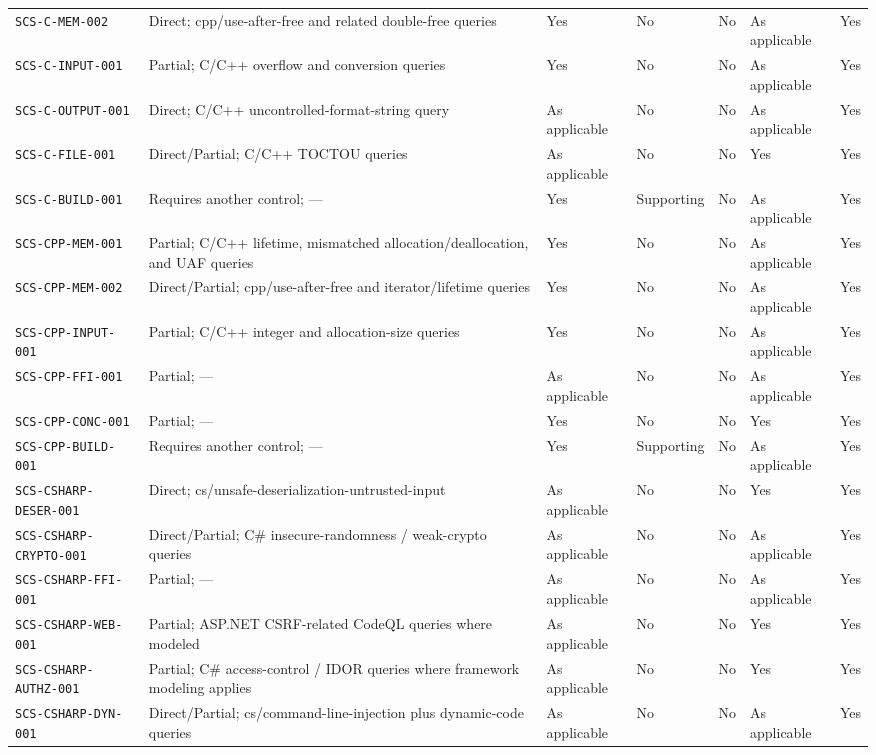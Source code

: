 \documentclass[10pt,letterpaper]{article}
\newcommand{\code}[1]{\begingroup\small\ttfamily\def\UrlFont{\ttfamily}\nolinkurl{#1}\endgroup}
\begin{document}
\begin{landscape}
\begin{longtable}{@{}P{1.4in}P{1.35in}P{1.1in}P{1.1in}P{0.95in}P{1.3in}P{1.0in}@{}}
\code{SCS-C-MEM-002} & Direct; cpp/use-after-free and related double-free queries & Yes & No & No & As applicable & Yes\\
\code{SCS-C-INPUT-001} & Partial; C/C++ overflow and conversion queries & Yes & No & No & As applicable & Yes\\
\code{SCS-C-OUTPUT-001} & Direct; C/C++ uncontrolled-format-string query & As applicable & No & No & As applicable & Yes\\
\code{SCS-C-FILE-001} & Direct/Partial; C/C++ TOCTOU queries & As applicable & No & No & Yes & Yes\\
\code{SCS-C-BUILD-001} & Requires another control; — & Yes & Supporting & No & As applicable & Yes\\
\code{SCS-CPP-MEM-001} & Partial; C/C++ lifetime, mismatched allocation/deallocation, and UAF queries & Yes & No & No & As applicable & Yes\\
\code{SCS-CPP-MEM-002} & Direct/Partial; cpp/use-after-free and iterator/lifetime queries & Yes & No & No & As applicable & Yes\\
\code{SCS-CPP-INPUT-001} & Partial; C/C++ integer and allocation-size queries & Yes & No & No & As applicable & Yes\\
\code{SCS-CPP-FFI-001} & Partial; — & As applicable & No & No & As applicable & Yes\\
\code{SCS-CPP-CONC-001} & Partial; — & Yes & No & No & Yes & Yes\\
\code{SCS-CPP-BUILD-001} & Requires another control; — & Yes & Supporting & No & As applicable & Yes\\
\code{SCS-CSHARP-DESER-001} & Direct; cs/unsafe-deserialization-untrusted-input & As applicable & No & No & Yes & Yes\\
\code{SCS-CSHARP-CRYPTO-001} & Direct/Partial; C\# insecure-randomness / weak-crypto queries & As applicable & No & No & As applicable & Yes\\
\code{SCS-CSHARP-FFI-001} & Partial; — & As applicable & No & No & As applicable & Yes\\
\code{SCS-CSHARP-WEB-001} & Partial; ASP.NET CSRF-related CodeQL queries where modeled & As applicable & No & No & Yes & Yes\\
\code{SCS-CSHARP-AUTHZ-001} & Partial; C\# access-control / IDOR queries where framework modeling applies & As applicable & No & No & Yes & Yes\\
\code{SCS-CSHARP-DYN-001} & Direct/Partial; cs/command-line-injection plus dynamic-code queries & As applicable & No & No & As applicable & Yes\\

\end{longtable}
\end{landscape}
\end{document}

